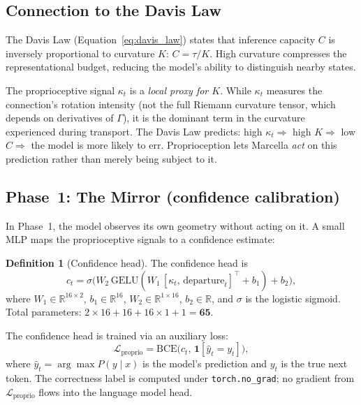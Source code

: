 \documentclass[11pt,a4paper]{article}
\theoremstyle{definition}
\newtheorem{definition}[theorem]{Definition}
\theoremstyle{remark}
\begin{document}
\subsection{Connection to the Davis Law}\label{sec:proprio_davis}

The Davis Law (Equation~\ref{eq:davis_law}) states that inference 
capacity $C$ is inversely proportional to curvature $K$: $C = 
\tau/K$. High curvature compresses the representational budget, 
reducing the model's ability to distinguish nearby states.

The proprioceptive signal $\kappa_t$ is a \emph{local proxy for 
$K$}. While $\kappa_t$ measures the connection's rotation intensity 
(not the full Riemann curvature tensor, which depends on derivatives 
of $\Gamma$), it is the dominant term in the curvature experienced 
during transport. The Davis Law predicts: high $\kappa_t \Rightarrow$ 
high $K \Rightarrow$ low $C \Rightarrow$ the model is more likely 
to err. Proprioception lets Marcella \emph{act} on this prediction 
rather than merely being subject to it.

\subsection{Phase~1: The Mirror (confidence calibration)}
\label{sec:proprio_phase1}

In Phase~1, the model observes its own geometry without acting on 
it. A small MLP maps the proprioceptive signals to a confidence 
estimate:

\begin{definition}[Confidence head]\label{def:confidence_head}
The confidence head is
\[
    c_t = \sigma\!\bigl(W_2\,\mathrm{GELU}(W_1\,[\kappa_t,\, 
    \mathrm{departure}_t]^\top + b_1) + b_2\bigr),
\]
where $W_1 \in \mathbb{R}^{16 \times 2}$, $b_1 \in \mathbb{R}^{16}$, 
$W_2 \in \mathbb{R}^{1 \times 16}$, $b_2 \in \mathbb{R}$, and 
$\sigma$ is the logistic sigmoid. Total parameters: 
$2 \times 16 + 16 + 16 \times 1 + 1 = \mathbf{65}$.
\end{definition}

The confidence head is trained via an auxiliary loss:
\begin{equation}\label{eq:proprio_loss}
    \mathcal{L}_{\mathrm{proprio}} = \mathrm{BCE}\bigl(c_t,\, 
    \mathbf{1}[\hat{y}_t = y_t]\bigr),
\end{equation}
where $\hat{y}_t = \arg\max P(y \mid x)$ is the model's prediction 
and $y_t$ is the true next token. The correctness label is computed 
under \texttt{torch.no\_grad}; no gradient from 
$\mathcal{L}_{\mathrm{proprio}}$ flows into the language model head.
\end{document}
